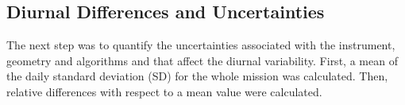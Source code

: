 \documentclass[onecolumn,3p,letterpaper,11pt]{elsarticle}
\begin{document}

 

\subsection{Diurnal Differences and Uncertainties}
The next step was to quantify the uncertainties associated with the instrument, geometry and algorithms and that affect the diurnal variability. First, a mean of the daily standard deviation (SD) for the whole mission was calculated. Then, relative differences with respect to a mean value were calculated.
\end{document}
